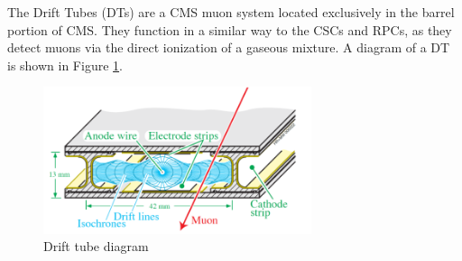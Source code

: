 The Drift Tubes (DTs) are a CMS muon system located exclusively in the barrel portion of CMS. They function in a similar way to the CSCs and RPCs, as they detect muons via the direct ionization of a gaseous mixture. A diagram of a DT is shown in Figure \ref{fig:DT_Diagram}. 

\begin{figure}[H]
    \centering
    \includegraphics[width=0.7\textwidth]{Images/CMS/Muons/DT/DT_diagram.png}
    \caption{Drift tube diagram}
    \label{fig:DT_Diagram}
\end{figure}

